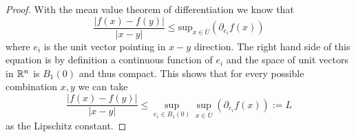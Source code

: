 \begin{proof}
	With the mean value theorem of differentiation we know that
	\begin{equation}
		\frac{|f(x)-f(y)|}{|x-y|}\leq \mathrm{sup}_{x\in\overline{U}}\left(\partial_{e_i}f(x)\right)
	\end{equation}
	where $e_i$ is the unit vector pointing in $x-y$ direction.
	The right hand side of this equation is by definition a continuous function of $e_i$ and the space of unit vectors in $\mathbb{R}^n$ is $B_1(0)$ and thus compact.
	This shows that for every possible combination $x,y$ we can take
	\begin{equation}
		\frac{|f(x)-f(y)|}{|x-y|}\leq \sup_{e_i\in B_1(0)}\sup_{x\in\overline{U}}\left(\partial_{e_i}f(x)\right):=L
	\end{equation}
	as the Lipschitz constant.
\end{proof}
% 
% 


